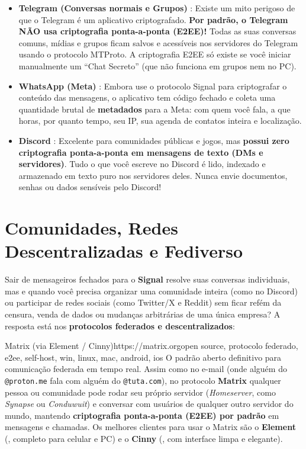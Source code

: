 \documentclass{pousadaguide}
\begin{document}
\begin{perigo}
\begin{itemize}
  \item \textbf{Telegram (Conversas normais e Grupos)} : Existe um mito perigoso de que o Telegram é um aplicativo criptografado. \textbf{Por padrão, o Telegram NÃO usa criptografia ponta-a-ponta (E2EE)!} Todas as suas conversas comuns, mídias e grupos ficam salvos e acessíveis nos servidores do Telegram usando o protocolo MTProto. A criptografia E2EE só existe se você iniciar manualmente um ``Chat Secreto'' (que não funciona em grupos nem no PC).
  \item \textbf{WhatsApp (Meta)} : Embora use o protocolo Signal para criptografar o conteúdo das mensagens, o aplicativo tem código fechado e coleta uma quantidade brutal de \textbf{metadados} para a Meta: com quem você fala, a que horas, por quanto tempo, seu IP, sua agenda de contatos inteira e localização.
  \item \textbf{Discord} : Excelente para comunidades públicas e jogos, mas \textbf{possui zero criptografia ponta-a-ponta em mensagens de texto (DMs e servidores)}. Tudo o que você escreve no Discord é lido, indexado e armazenado em texto puro nos servidores deles. Nunca envie documentos, senhas ou dados sensíveis pelo Discord!
\end{itemize}
\end{perigo}

\section{Comunidades, Redes Descentralizadas e Fediverso}

Sair de mensageiros fechados para o \textbf{Signal} resolve suas conversas individuais, mas e quando você precisa organizar uma comunidade inteira (como no Discord) ou participar de redes sociais (como Twitter/X e Reddit) sem ficar refém da censura, venda de dados ou mudanças arbitrárias de uma única empresa? A resposta está nos \textbf{protocolos federados e descentralizados}:

\begin{ferramenta}[goat,logo=matrix]{Matrix (via Element / Cinny)}{https://matrix.org}{open source, protocolo federado, e2ee, self-host, win, linux, mac, android, ios}
O padrão aberto definitivo para comunicação federada em tempo real. Assim como no e-mail (onde alguém do \texttt{@proton.me} fala com alguém do \texttt{@tuta.com}), no protocolo \textbf{Matrix} qualquer pessoa ou comunidade pode rodar seu próprio servidor (\emph{Homeserver}, como \emph{Synapse} ou \emph{Conduwuit}) e conversar com usuários de qualquer outro servidor do mundo, mantendo \textbf{criptografia ponta-a-ponta (E2EE) por padrão} em mensagens e chamadas. Os melhores clientes para usar o Matrix são o \textbf{Element} (, completo para celular e PC) e o \textbf{Cinny} (, com interface limpa e elegante). 
\end{ferramenta}
\end{document}

